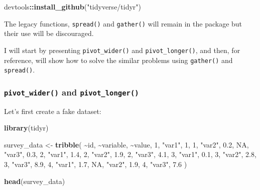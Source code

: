 \documentclass[
]{article}
\newenvironment{Shaded}{\begin{snugshade}}{\end{snugshade}}
\newcommand{\DecValTok}[1]{\textcolor[rgb]{0.00,0.00,0.81}{#1}}
\newcommand{\FloatTok}[1]{\textcolor[rgb]{0.00,0.00,0.81}{#1}}
\newcommand{\KeywordTok}[1]{\textcolor[rgb]{0.13,0.29,0.53}{\textbf{#1}}}
\newcommand{\NormalTok}[1]{#1}
\newcommand{\OperatorTok}[1]{\textcolor[rgb]{0.81,0.36,0.00}{\textbf{#1}}}
\newcommand{\OtherTok}[1]{\textcolor[rgb]{0.56,0.35,0.01}{#1}}
\newcommand{\StringTok}[1]{\textcolor[rgb]{0.31,0.60,0.02}{#1}}
\begin{document}
\begin{Shaded}
\begin{Highlighting}[]
\NormalTok{devtools}\OperatorTok{::}\KeywordTok{install\_github}\NormalTok{(}\StringTok{"tidyverse/tidyr"}\NormalTok{)}
\end{Highlighting}
\end{Shaded}

The legacy functions, \texttt{spread()} and \texttt{gather()} will remain in the package but their use will be
discouraged.

I will start by presenting \texttt{pivot\_wider()} and \texttt{pivot\_longer()}, and then, for reference, will show
how to solve the similar problems using \texttt{gather()} and \texttt{spread()}.

\hypertarget{pivot_wider-and-pivot_longer}{%
\subsubsection{\texorpdfstring{\texttt{pivot\_wider()} and \texttt{pivot\_longer()}}{pivot\_wider() and pivot\_longer()}}\label{pivot_wider-and-pivot_longer}}

Let's first create a fake dataset:

\begin{Shaded}
\begin{Highlighting}[]
\KeywordTok{library}\NormalTok{(tidyr)}
\end{Highlighting}
\end{Shaded}

\begin{Shaded}
\begin{Highlighting}[]
\NormalTok{survey\_data \textless{}{-}}\StringTok{ }\KeywordTok{tribble}\NormalTok{(}
  \OperatorTok{\textasciitilde{}}\NormalTok{id, }\OperatorTok{\textasciitilde{}}\NormalTok{variable, }\OperatorTok{\textasciitilde{}}\NormalTok{value,}
  \DecValTok{1}\NormalTok{, }\StringTok{"var1"}\NormalTok{, }\DecValTok{1}\NormalTok{,}
  \DecValTok{1}\NormalTok{, }\StringTok{"var2"}\NormalTok{, }\FloatTok{0.2}\NormalTok{,}
  \OtherTok{NA}\NormalTok{, }\StringTok{"var3"}\NormalTok{, }\FloatTok{0.3}\NormalTok{,}
  \DecValTok{2}\NormalTok{, }\StringTok{"var1"}\NormalTok{, }\FloatTok{1.4}\NormalTok{,}
  \DecValTok{2}\NormalTok{, }\StringTok{"var2"}\NormalTok{, }\FloatTok{1.9}\NormalTok{,}
  \DecValTok{2}\NormalTok{, }\StringTok{"var3"}\NormalTok{, }\FloatTok{4.1}\NormalTok{,}
  \DecValTok{3}\NormalTok{, }\StringTok{"var1"}\NormalTok{, }\FloatTok{0.1}\NormalTok{,}
  \DecValTok{3}\NormalTok{, }\StringTok{"var2"}\NormalTok{, }\FloatTok{2.8}\NormalTok{,}
  \DecValTok{3}\NormalTok{, }\StringTok{"var3"}\NormalTok{, }\FloatTok{8.9}\NormalTok{,}
  \DecValTok{4}\NormalTok{, }\StringTok{"var1"}\NormalTok{, }\FloatTok{1.7}\NormalTok{,}
  \OtherTok{NA}\NormalTok{, }\StringTok{"var2"}\NormalTok{, }\FloatTok{1.9}\NormalTok{,}
  \DecValTok{4}\NormalTok{, }\StringTok{"var3"}\NormalTok{, }\FloatTok{7.6}
\NormalTok{)}

\KeywordTok{head}\NormalTok{(survey\_data)}
\end{Highlighting}
\end{Shaded}
\end{document}
